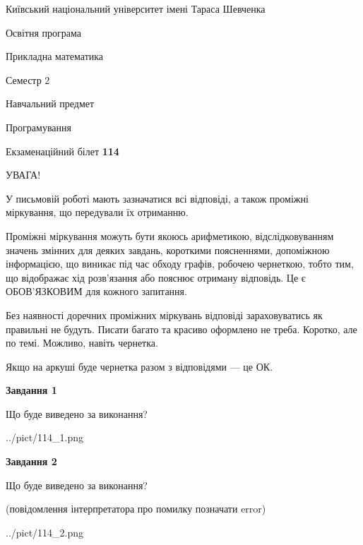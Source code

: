 \documentclass[12pt, ukrainian]{article}
\begin{document}
{{\begin {small}\par
{ \center  Київський національний університет імені Тараса Шевченка \par}
{\parbox {5 cm}{Освітня програма \hfill}{\parbox {7 cm}{Прикладна математика\hfill}}\parbox {6 cm}{\hfill Семестр 2}}\par
{\parbox {5 cm} {Навчальний предмет \hfill}\parbox {7 cm}{Програмування \hfill}\parbox {6cm}{\hfill}\par}\vspace{-7pt} \end{small}}{\center Екзаменаційний білет \No \textbf
{ 114 }\par}}
{
\begin {large}
УВАГА!

У письмовій роботі мають зазначатися всі відповіді, а також проміжні міркування, що передували їх отриманню.

Проміжні міркування можуть бути якоюсь арифметикою, відслідковуванням зна\-чень змінних для деяких завдань,
короткими поясненнями, допоміжною інформацією, що виникає під час обходу графів, робочею чернеткою,
тобто тим, що відображає хід розв’язання або пояснює отриману відповідь.
Це є ОБОВ’ЯЗКОВИМ для кожного запитання.

Без наявності доречних проміжних міркувань відповіді зараховуватись як правиль\-ні не будуть.
Писати багато та красиво оформлено не треба. Коротко, але по темі. Можли\-во, навіть чернетка.

Якщо на аркуші буде чернетка разом з відповідями --- це ОК.

\newpage

{\begin {center}\textbf{Завдання 1}\end {center}}\par
Що буде виведено за виконання?\par
\begin{center}
	{../pict/114_1.png}
\end{center}
\newpage

{\begin {center}\textbf{Завдання 2}\end {center}}\par
Що буде виведено за виконання?\par
 (повідомлення інтерпретатора про помилку позначати error)\par
\begin{center}
	{../pict/114_2.png}
\end{center}
\newpage


\end{large}}
\end{document}
